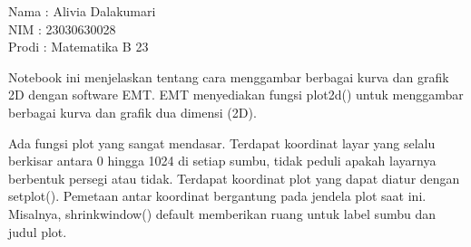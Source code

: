 \documentclass[a4paper,10pt]{article}
\begin{document}
\begin{eulernotebook}
\eulersubheading{}
\begin{eulercomment}
Nama : Alivia Dalakumari\\
NIM : 23030630028\\
Prodi : Matematika B 23

\begin{eulercomment}
\begin{eulercomment}
Notebook ini menjelaskan tentang cara menggambar berbagai kurva dan
grafik 2D dengan software EMT. EMT menyediakan fungsi plot2d() untuk
menggambar berbagai kurva dan grafik dua dimensi (2D).\\
\end{eulercomment}
\begin{eulercomment}
Ada fungsi plot yang sangat mendasar. Terdapat koordinat layar yang
selalu berkisar antara 0 hingga 1024 di setiap sumbu, tidak peduli
apakah layarnya berbentuk persegi atau tidak. Terdapat koordinat plot
yang dapat diatur dengan setplot(). Pemetaan antar koordinat
bergantung pada jendela plot saat ini. Misalnya, shrinkwindow()
default memberikan ruang untuk label sumbu dan judul plot.


\end{eulercomment}
\end{eulercomment}
\end{eulercomment}
\end{eulernotebook}
\end{document}
